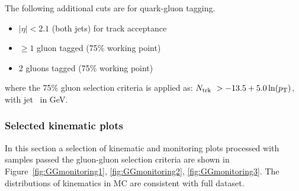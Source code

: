 The following additional cuts are for quark-gluon tagging.
\begin{itemize}
	\item $|\eta| < 2.1$ (both jets) for track acceptance
	\item $\ge 1$ gluon tagged (75\% working point)
	\item 2 gluons tagged (75\% working point)
\end{itemize}
where the 75\% gluon selection criteria is applied as: $N_{\mathrm{trk}}~> - 13.5 +
5.0\ln(p_{\mathrm{T}})$, with jet \pt\ in GeV.


\FloatBarrier

%
\subsubsection{Selected kinematic plots}

In this section a selection of kinematic and monitoring plots processed with samples passed the gluon-gluon selection criteria are shown in Figure~\ref{fig:GGmonitoring1}, \ref{fig:GGmonitoring2}, \ref{fig:GGmonitoring3}. The distributions of kinematics in MC are consistent with full dataset.


